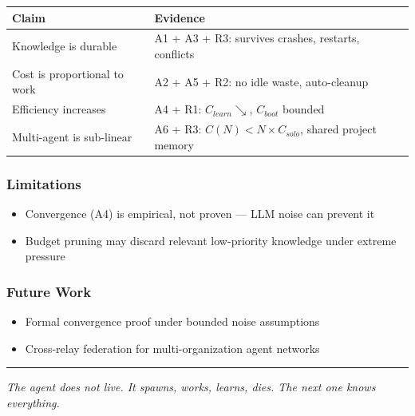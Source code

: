 \documentclass[11pt]{article}
\providecommand{\tightlist}{%
      \setlength{\itemsep}{0pt}\setlength{\parskip}{0pt}}
\begin{document}
\begin{longtable}[]{@{}
  >{\raggedright\arraybackslash}p{}
  >{\raggedright\arraybackslash}p{}@{}}
\toprule\noalign{}
\begin{minipage}[b]{\linewidth}\raggedright
Claim
\end{minipage} & \begin{minipage}[b]{\linewidth}\raggedright
Evidence
\end{minipage} \\
\midrule\noalign{}
\endhead
\bottomrule\noalign{}
\endlastfoot
Knowledge is durable & A1 + A3 + R3: survives crashes, restarts,
conflicts \\
Cost is proportional to work & A2 + A5 + R2: no idle waste,
auto-cleanup \\
Efficiency increases & A4 + R1: \(C_{learn} \searrow\), \(C_{boot}\)
bounded \\
Multi-agent is sub-linear & A6 + R3: \(C(N) < N \times C_{solo}\),
shared project memory \\
\end{longtable}

\subsubsection{Limitations}\label{limitations}

\begin{itemize}
\tightlist
\item
  Convergence (A4) is empirical, not proven --- LLM noise can prevent it
\item
  Budget pruning may discard relevant low-priority knowledge under
  extreme pressure
\end{itemize}

\subsubsection{Future Work}\label{future-work}

\begin{itemize}
\tightlist
\item
  Formal convergence proof under bounded noise assumptions
\item
  Cross-relay federation for multi-organization agent networks
\end{itemize}

\begin{center}\rule{0.5\linewidth}{0.5pt}\end{center}

\emph{The agent does not live. It spawns, works, learns, dies. The next
one knows everything.}


    
    
    
\end{document}
